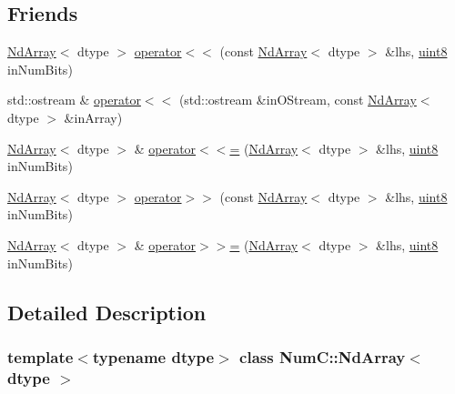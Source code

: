 \subsection*{Friends}
\begin{DoxyCompactItemize}
\item 
\mbox{\hyperlink{class_num_c_1_1_nd_array}{Nd\+Array}}$<$ dtype $>$ \mbox{\hyperlink{class_num_c_1_1_nd_array_ad870c7e142d724ed1a984e4e0998d871}{operator$<$$<$}} (const \mbox{\hyperlink{class_num_c_1_1_nd_array}{Nd\+Array}}$<$ dtype $>$ \&lhs, \mbox{\hyperlink{namespace_num_c_a60b2e2f49e1ff61059731c154e560869}{uint8}} in\+Num\+Bits)
\item 
std\+::ostream \& \mbox{\hyperlink{class_num_c_1_1_nd_array_a7bc4555bca4773adf8f4e51ca73c13ed}{operator$<$$<$}} (std\+::ostream \&in\+O\+Stream, const \mbox{\hyperlink{class_num_c_1_1_nd_array}{Nd\+Array}}$<$ dtype $>$ \&in\+Array)
\item 
\mbox{\hyperlink{class_num_c_1_1_nd_array}{Nd\+Array}}$<$ dtype $>$ \& \mbox{\hyperlink{class_num_c_1_1_nd_array_ad35a1fb99d88618e4446403e9f77d228}{operator$<$$<$=}} (\mbox{\hyperlink{class_num_c_1_1_nd_array}{Nd\+Array}}$<$ dtype $>$ \&lhs, \mbox{\hyperlink{namespace_num_c_a60b2e2f49e1ff61059731c154e560869}{uint8}} in\+Num\+Bits)
\item 
\mbox{\hyperlink{class_num_c_1_1_nd_array}{Nd\+Array}}$<$ dtype $>$ \mbox{\hyperlink{class_num_c_1_1_nd_array_ab15a0eab1b334b204ab5dd780c35435a}{operator$>$$>$}} (const \mbox{\hyperlink{class_num_c_1_1_nd_array}{Nd\+Array}}$<$ dtype $>$ \&lhs, \mbox{\hyperlink{namespace_num_c_a60b2e2f49e1ff61059731c154e560869}{uint8}} in\+Num\+Bits)
\item 
\mbox{\hyperlink{class_num_c_1_1_nd_array}{Nd\+Array}}$<$ dtype $>$ \& \mbox{\hyperlink{class_num_c_1_1_nd_array_a176583bd05fbbbf2f7ef9984cac49f76}{operator$>$$>$=}} (\mbox{\hyperlink{class_num_c_1_1_nd_array}{Nd\+Array}}$<$ dtype $>$ \&lhs, \mbox{\hyperlink{namespace_num_c_a60b2e2f49e1ff61059731c154e560869}{uint8}} in\+Num\+Bits)
\end{DoxyCompactItemize}


\subsection{Detailed Description}
\subsubsection*{template$<$typename dtype$>$\newline
class Num\+C\+::\+Nd\+Array$<$ dtype $>$}

